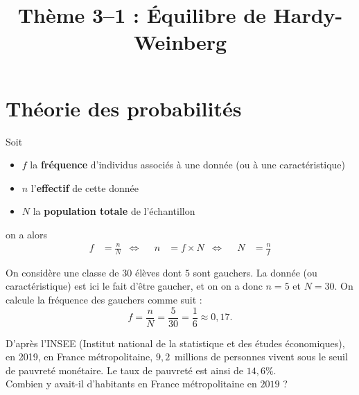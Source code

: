 \documentclass[11pt]{article}
\title{Thème 3--1 : Équilibre de Hardy-Weinberg}
\date{}
\author{}
\begin{document}
\maketitle\thispagestyle{fancy}

%

\section{Théorie des probabilités}
\begin{prop}
  Soit
  \begin{itemize}
    \item $f$ la \textbf{fréquence} d'individus associés à une donnée (ou à une
      caractéristique)
    \item $n$ l'\textbf{effectif} de cette donnée
    \item $N$ la \textbf{population totale} de l'échantillon
  \end{itemize}
  on a alors
  \begin{align*}
    f &= \frac{n}{N} &
    \Leftrightarrow & &
    n &= f\times N &
    \Leftrightarrow & &
     N &= \frac{n}{f}
  \end{align*}
\end{prop}
\begin{exemple}
  On considère une classe de $30$ élèves dont $5$ sont gauchers. La donnée (ou
  caractéristique) est ici le fait d'être gaucher, et on on a donc $n=5$ et
  $N=30$. On calcule la fréquence des gauchers comme suit :
  \[
    f = \frac{n}{N} = \frac{5}{30} = \frac{1}{6} \approx 0,17.
  \]
\end{exemple}
\begin{app}
  D'après l'INSEE (Institut national de la statistique et des études
  économiques), en 2019, en France métropolitaine, $9,2$ millions de
  personnes vivent sous le seuil de pauvreté monétaire. Le taux de pauvreté est
  ainsi de $14,6$\%.\\Combien y avait-il d'habitants en France métropolitaine en $2019$ ?
\end{app}
\end{document}
